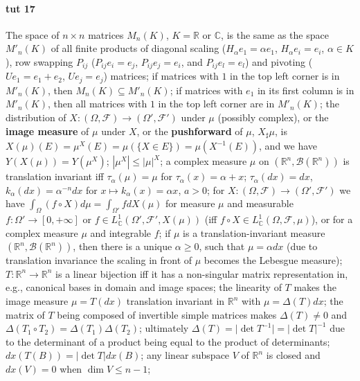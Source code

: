\documentclass[a4paper]{article}
\newcommand{\Fcal}{\mathcal{F}}
\newcommand{\Bcal}{\mathcal{B}}
\newcommand{\real}{\mathbb{R}}
\newcommand{\cplx}{\mathbb{C}}
\begin{document}


\paragraph{tut 17} %
\label{par:tut_17}

The space of $n\times n$ matrices $M_n(K)$, $K = \real$ or $\cplx$, is the same as
the space $M'_n(K)$ of all finite products of diagonal scaling ($H_\alpha e_1 = \alpha e_1$,
$H_\alpha e_i = e_i$, $\alpha \in K$), row swapping $P_{ij}$ ($P_{ij} e_i = e_j$,
$P_{ij} e_j = e_i$, and $P_{ij} e_l = e_l$) and pivoting ($U e_1 = e_1 + e_2$, $U e_j = e_j$)
matrices;
%
if matrices with $1$ in the top left corner is in $M'_n(K)$, then $M_n(K)\subseteq M'_n(K)$;
%
if matrices with $e_1$ in its first column is in $M'_n(K)$, then all matrices with
$1$ in the top left corner are in $M'_n(K)$;
%
the distribution of $X\colon (\Omega, \Fcal) \to (\Omega', \Fcal')$ under $\mu$ (possibly
complex), or the {\bf image measure} of $\mu$ under $X$, or the {\bf pushforward} of
$\mu$, $X_\sharp\mu$, is $X(\mu)(E) = \mu^X(E) = \mu(\{X \in E\}) = \mu(X^{-1}(E))$,
and we have $Y(X(\mu)) = Y(\mu^X)$;
%
$|\mu^X| \leq |\mu|^X$;
%
a complex measure $\mu$ on $(\real^n, \Bcal(\real^n))$ is translation invariant iff
$\tau_\alpha(\mu) = \mu$ for $\tau_\alpha(x) = \alpha + x$;
%
$\tau_\alpha(dx) = dx$, $k_\alpha(dx) = \alpha^{-n} dx$ for $x\mapsto k_\alpha(x) =
\alpha x$, $a > 0$;
%
for $X\colon (\Omega, \Fcal) \to (\Omega', \Fcal')$ we have $\int_{\Omega} (f \circ X)
d\mu = \int_{\Omega'} f dX(\mu)$ for measure $\mu$ and measurable $f\colon \Omega' \to
[0, +\infty]$ or $f\in L^1_\cplx(\Omega', \Fcal', X(\mu))$ (iff $f\circ X \in
L^1_\cplx(\Omega, \Fcal, \mu)$), or for a complex measure $\mu$ and integrable $f$;
%
if $\mu$ is a translation-invariant measure $(\real^n, \Bcal(\real^n))$, then there
is a unique $\alpha \geq 0$, such that $\mu = \alpha dx$ (due to translation invariance
the scaling in front of $\mu$ becomes the Lebesgue measure);
%
$T\colon \real^n \to \real^n$ is a linear bijection iff it has a non-singular matrix
representation in, e.g., canonical bases in domain and image spaces;
%
the linearity of $T$ makes the image measure $\mu = T(dx)$ translation invariant in
$\real^n$ with $\mu = \Delta(T) dx$;
%
the matrix of $T$ being composed of invertible simple matrices makes $\Delta(T) \neq
0$ and $\Delta(T_1 \circ T_2) = \Delta(T_1) \Delta(T_2)$;
%
ultimately $\Delta(T) = \lvert \det T^{-1} \rvert = \lvert \det T \rvert^{-1}$ due
to the determinant of a product being equal to the product of determinants;
%
$dx(T(B)) = \lvert \det T\rvert dx(B)$;
%
any linear subspace $V$ of $\real^n$ is closed and $dx(V) = 0$ when $\dim V \leq n-1$;
\end{document}

